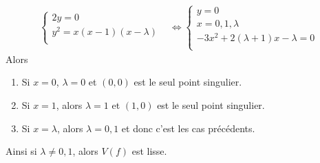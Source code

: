 \begin{expl}
\begin{enumerate}
\begin{align*}
\begin{cases}
                        2y = 0 \\
                        y^2 = x(x-1)(x - \lambda) \\
                        \end{cases}
                        &\iff 
                        \begin{cases}
                            y = 0 \\
                            x = 0,1,\lambda \\
                            -3x^2 + 2(\lambda + 1)x - \lambda = 0 \\
                        \end{cases}
                    \end{align*}
                    Alors
                    \begin{enumerate}
                        \item Si $x = 0$, $\lambda = 0$ et $(0,0)$ est le seul point singulier.
                        \item Si $x = 1$, alors $\lambda = 1$ et $(1,0)$ est le seul point singulier.
                        \item Si $x = \lambda$, alors $\lambda = 0,1$ et donc c'est les cas précédents.
                    \end{enumerate}
                    Ainsi si $\lambda \neq 0,1$, alors $V(f)$ est lisse.
                \end{enumerate}
            \end{expl}

